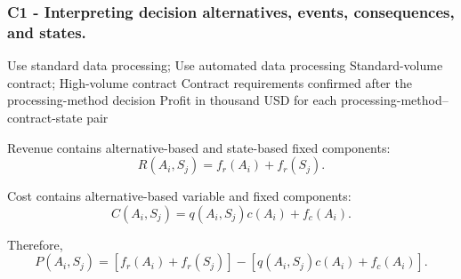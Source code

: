 	\subsubsection*{C1 - Interpreting decision alternatives, events, consequences, and states.}
	\label{subsec:problem14-data-service-contract-c1}

	\DecisionElementsTable
	{Use standard data processing; Use automated data processing}
	{Standard-volume contract; High-volume contract}
	{Contract requirements confirmed after the processing-method decision}
	{Profit in thousand USD for each processing-method--contract-state pair}

	Revenue contains alternative-based and state-based fixed components:
	\[
	R(A_i,S_j)
	=
	f_r(A_i)+f_r(S_j).
	\]

	Cost contains alternative-based variable and fixed components:
	\[
	C(A_i,S_j)
	=
	q(A_i,S_j)c(A_i)+f_c(A_i).
	\]

	Therefore,
	\[
	P(A_i,S_j)
	=
	\left[
	f_r(A_i)+f_r(S_j)
	\right]
	-
	\left[
	q(A_i,S_j)c(A_i)+f_c(A_i)
	\right].
	\]


